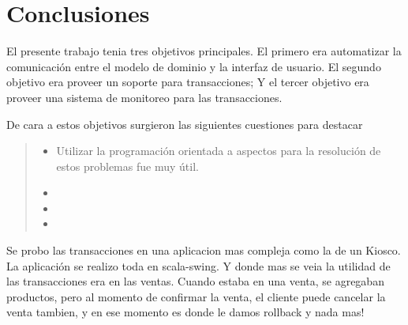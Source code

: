 \section{Conclusiones}
\label{sec:conclusions}

El presente trabajo tenia tres objetivos principales. El primero era automatizar
la comunicación entre el modelo de dominio y la interfaz de usuario. El segundo
objetivo era proveer un soporte para transacciones; Y el tercer objetivo era
proveer una sistema de monitoreo para las transacciones.

De cara a estos objetivos surgieron las siguientes cuestiones para destacar

\begin{quote}

	\begin{itemize}
	  
		\item Utilizar la programación orientada a aspectos para la resolución de
		estos problemas fue muy útil.
		
		\item  
		
		\item 
		\item 
	  
	\end{itemize}
	
\end{quote}

Se probo las transacciones en una aplicacion mas compleja como la de un Kiosco.
La aplicación se realizo toda en scala-swing. Y donde mas se veia la utilidad de
las transacciones era en las ventas. Cuando estaba en una venta, se agregaban
productos, pero al momento de confirmar la venta, el cliente puede cancelar la
venta tambien, y en ese momento es donde le damos rollback y nada mas!
